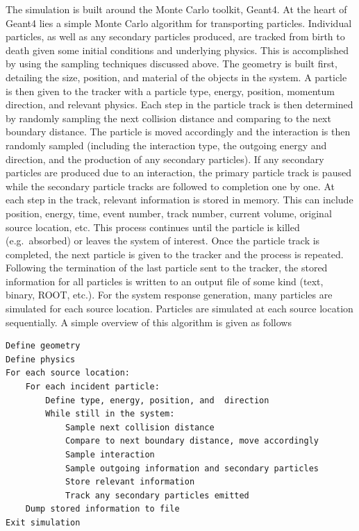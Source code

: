 \documentclass[10pt]{article}
\begin{document}
The simulation is built around the Monte Carlo toolkit, Geant4. At the heart of Geant4 lies a simple Monte Carlo algorithm for transporting particles. Individual particles, as well as any secondary particles produced, are tracked from birth to death given some initial conditions and underlying physics. This is accomplished by using the sampling techniques discussed above. The geometry is built first, detailing the size, position, and material of the objects in the system. A particle is then given to the tracker with a particle type, energy, position, momentum direction, and relevant physics. Each step in the particle track is then determined by randomly sampling the next collision distance and comparing to the next boundary distance. The particle is moved accordingly and the interaction is then randomly sampled (including the interaction type, the outgoing energy and direction, and the production of any secondary particles). If any secondary particles are produced due to an interaction, the primary particle track is paused while the secondary particle tracks are followed to completion one by one. At each step in the track, relevant information is stored in memory. This can include position, energy, time, event number, track number, current volume, original source location, etc. This process continues until the particle is killed (e.g.~absorbed) or leaves the system of interest. Once the particle track is completed, the next particle is given to the tracker and the process is repeated. Following the termination of the last particle sent to the tracker, the stored information for all particles is written to an output file of some kind (text, binary, ROOT, etc.). For the system response generation, many particles are simulated for each source location. Particles are simulated at each source location sequentially. A simple overview of this algorithm is given as follows

\begin{lstlisting}
Define geometry
Define physics
For each source location:
	For each incident particle:
		Define type, energy, position, and  direction
		While still in the system:
			Sample next collision distance
			Compare to next boundary distance, move accordingly
			Sample interaction
			Sample outgoing information and secondary particles
			Store relevant information
			Track any secondary particles emitted
	Dump stored information to file 
Exit simulation
\end{lstlisting}
\end{document}
